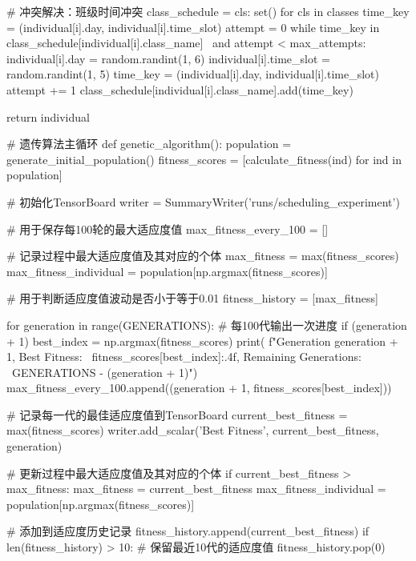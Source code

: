 \documentclass{ctexart}
\begin{document}
\begin{pythoncode}
	            # 冲突解决：班级时间冲突
	            class_schedule = {cls: set() for cls in classes}
	            time_key = (individual[i].day, individual[i].time_slot)
	            attempt = 0
	            while time_key in class_schedule[individual[i].class_name] \
	                    and attempt < max_attempts:
	                individual[i].day = random.randint(1, 6)
	                individual[i].time_slot = random.randint(1, 5)
	                time_key = (individual[i].day, individual[i].time_slot)
	                attempt += 1
	            class_schedule[individual[i].class_name].add(time_key)
	
	    return individual
	
	# 遗传算法主循环
	def genetic_algorithm():
	    population = generate_initial_population()
	    fitness_scores = [calculate_fitness(ind) for ind in population]
	
	    # 初始化TensorBoard
	    writer = SummaryWriter('runs/scheduling_experiment')
	
	    # 用于保存每100轮的最大适应度值
	    max_fitness_every_100 = []
	
	    # 记录过程中最大适应度值及其对应的个体
	    max_fitness = max(fitness_scores)
	    max_fitness_individual = population[np.argmax(fitness_scores)]
	
	    # 用于判断适应度值波动是否小于等于0.01
	    fitness_history = [max_fitness]
	
	    for generation in range(GENERATIONS):
	        # 每100代输出一次进度
	        if (generation + 1) %
	            best_index = np.argmax(fitness_scores)
	            print(
	                f"Generation {generation + 1}, Best Fitness: \
	                {fitness_scores[best_index]:.4f}, Remaining Generations: \
	                {GENERATIONS - (generation + 1)}")
	            max_fitness_every_100.append((generation + 1, fitness_scores[best_index]))
	
	        # 记录每一代的最佳适应度值到TensorBoard
	        current_best_fitness = max(fitness_scores)
	        writer.add_scalar('Best Fitness', current_best_fitness, generation)
	
	        # 更新过程中最大适应度值及其对应的个体
	        if current_best_fitness > max_fitness:
	            max_fitness = current_best_fitness
	            max_fitness_individual = population[np.argmax(fitness_scores)]
	
	        # 添加到适应度历史记录
	        fitness_history.append(current_best_fitness)
	        if len(fitness_history) > 10:  # 保留最近10代的适应度值
	            fitness_history.pop(0)
	

\end{pythoncode}
\end{document}
